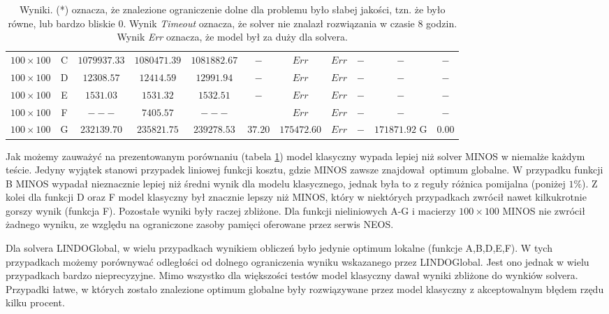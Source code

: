 \begin{table}[H]
\begin{center}
{\begin{tabular}{c|c||c|c|c|c||c||c|c||c|c}
            $100 \times 100$ & C           & $1079937.33$ & $1080471.39$ & $1081882.67$ & $-$   & $Err$         & $Err$ & $-$                     & $-$ & $-$ \\
            $100 \times 100$ & D           & $12308.57$ & $12414.59$ & $12991.94$ & $-$         & $Err$         & $Err$ & $-$                     & $-$ & $-$ \\
            $100 \times 100$ & E           & $1531.03$ & $1531.32$ & $1532.51$ & $-$            & $Err$         & $Err$ & $-$                     & $-$ & $-$ \\
            $100 \times 100$ & F           & $---$ & $7405.57$ & $---$ &                        & $Err$         & $Err$ & $-$                     & $-$ & $-$ \\
            $100 \times 100$ & G           & $232139.70$ & $235821.75$ & $239278.53$ & $37.20$  & $175472.60$   & $Err$ & $-$                     & $171871.92$ G & $0.00$ \\
        \end{tabular}
        } 
    \end{center}
    \caption{Wyniki. (*) oznacza, że znalezione ograniczenie dolne dla problemu było słabej jakości, tzn. że było równe, lub bardzo bliskie $0$. 
        Wynik \textit{Timeout} oznacza, że solver nie znalazł rozwiązania w czasie 8 godzin. 
        Wynik \textit{Err} oznacza, że model był za duży dla solvera.}
    \label{wyniki-1}
\end{table}


Jak możemy zauważyć na prezentowanym porównaniu (tabela \ref{wyniki-1}) model klasyczny wypada lepiej niż solver MINOS w niemalże każdym teście. Jedyny 
wyjątek stanowi przypadek liniowej funkcji kosztu, gdzie MINOS zawsze znajdował optimum globalne. W przypadku funkcji B MINOS wypadał nieznacznie 
lepiej niż średni wynik dla modelu klasycznego, jednak była to z reguły różnica pomijalna (poniżej $1\%$). Z kolei dla funkcji D oraz F model 
klasyczny był znacznie lepszy niż MINOS, który w niektórych przypadkach zwrócił nawet kilkukrotnie gorszy wynik (funkcja F). Pozostałe wyniki były raczej 
zbliżone. Dla funkcji nieliniowych A-G i macierzy $100 \times 100$ MINOS nie zwrócił żadnego wyniku, ze względu na ograniczone zasoby pamięci oferowane 
przez serwis NEOS. 

Dla solvera LINDOGlobal, w wielu przypadkach wynikiem obliczeń było jedynie optimum lokalne (funkcje A,B,D,E,F). W tych przypadkach możemy 
porównywać odległości od dolnego ograniczenia wyniku wskazanego przez LINDOGlobal. Jest ono jednak w wielu przypadkach bardzo nieprecyzyjne. 
Mimo wszystko dla większości testów model klasyczny dawał wyniki zbliżone do wynkiów solvera. Przypadki łatwe, w których zostało znalezione optimum 
globalne były rozwiązywane przez model klasyczny z akceptowalnym błędem rzędu kilku procent.

